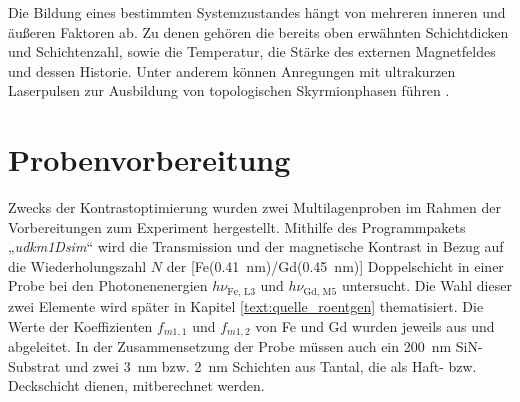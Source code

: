 \noindent
Die Bildung eines bestimmten Systemzustandes hängt von mehreren inneren und äußeren Faktoren ab. Zu denen gehören die bereits oben erwähnten Schichtdicken und Schichtenzahl, sowie die Temperatur, die Stärke des externen Magnetfeldes und dessen Historie. Unter anderem können Anregungen mit ultrakurzen Laserpulsen zur Ausbildung von topologischen Skyrmionphasen führen \cite{buttner_observation_2021}.



\section{Probenvorbereitung}
Zwecks der Kontrastoptimierung wurden zwei Multilagenproben im Rahmen der Vorbereitungen zum Experiment hergestellt. Mithilfe des Programmpakets „\emph{udkm1Dsim}“ \cite{schick_udkm1dsim_2021} wird die Transmission und der magnetische Kontrast in Bezug auf die Wiederholungszahl $N$ der [Fe(\SI{0.41}{\nano\meter})/Gd(\SI{0.45}{\nano\meter})] Doppelschicht in einer Probe bei den Photonenenergien $h\nu_{\text{Fe, L3}}$ und $h\nu_{\text{Gd, M5}}$ untersucht. Die Wahl dieser zwei Elemente wird später in Kapitel \ref{text:quelle_roentgen} thematisiert. Die Werte der Koeffizienten $f_{m1,1}$ und $f_{m1,2}$ von Fe und Gd wurden jeweils aus \cite[Abb. 4]{kortright_resonant_2000} und \cite[Abb. 2]{prieto-x-ray-2005} abgeleitet. In der Zusammensetzung der Probe müssen auch ein \SI{200}{\nano\meter} SiN-Substrat und zwei \SI{3}{\nano\meter} bzw. \SI{2}{\nano\meter} Schichten aus Tantal, die als Haft- bzw. Deckschicht dienen, mitberechnet werden.

